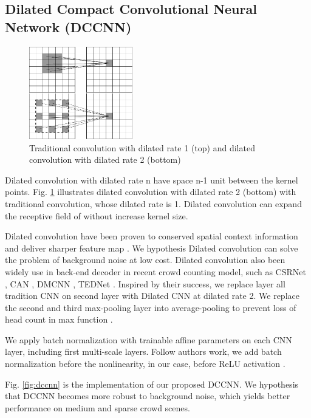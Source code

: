 \subsection{Dilated Compact Convolutional Neural Network (DCCNN)} 

\begin{figure}[htbp]
\centerline{\includegraphics[width=0.4\textwidth]{Picture/example/cnn_vs_dilated_cnn.png}}
\caption{Traditional convolution with dilated rate 1 (top) and dilated convolution with dilated rate 2 (bottom)}
\label{fig:cnn_vs_dilated}
\end{figure}

Dilated convolution with dilated rate n have space n-1 unit between the kernel points. Fig. \ref{fig:cnn_vs_dilated} illustrates dilated convolution with dilated rate 2 (bottom) with traditional convolution, whose dilated rate is 1. Dilated convolution can expand the receptive field of without increase kernel size.

Dilated convolution have been proven to conserved spatial context information  and deliver sharper feature map \cite{li2018csrnet}. We hypothesis Dilated convolution can solve the problem of background noise at low cost. Dilated convolution also been widely use in back-end decoder in recent crowd counting model, such as CSRNet \cite{li2018csrnet}, CAN \cite{liu2019context}, DMCNN \cite{zhang2019crowd}, TEDNet \cite{jiang2019crowd}. Inspired by their success, we replace layer all tradition CNN on second layer with Dilated CNN at dilated rate 2. We replace the second and third max-pooling layer into average-pooling to prevent loss of head count in max function \cite{zhang2019crowd}. 

We apply batch normalization \cite{ioffe2015batch} with trainable affine parameters on each CNN layer, including first multi-scale layers. Follow authors work, we add batch normalization before the nonlinearity, in our case, before ReLU activation \cite{agarap2018deep}. 

Fig. \ref{fig:dccnn} is the implementation of our proposed DCCNN.  We hypothesis that DCCNN becomes more robust to background noise, which yields better performance on medium and sparse crowd scenes. 

